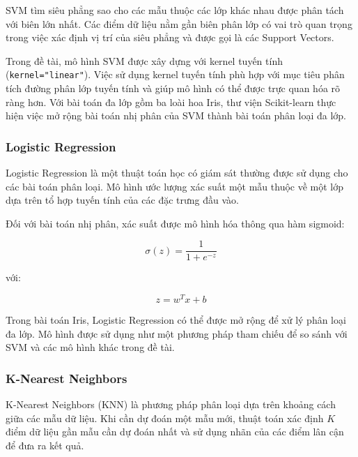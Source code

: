 \documentclass[14pt]{extarticle}
\begin{document}
		 	\noindent SVM tìm siêu phẳng sao cho các mẫu thuộc các lớp khác nhau được phân tách với biên lớn nhất. Các điểm dữ liệu nằm gần biên phân lớp có vai trò quan trọng trong việc xác định vị trí của siêu phẳng và được gọi là các Support Vectors.
		 
		 	\noindent Trong đề tài, mô hình SVM được xây dựng với kernel tuyến tính
		 (\texttt{kernel="linear"}). Việc sử dụng kernel tuyến tính phù hợp với mục
		 tiêu phân tích đường phân lớp tuyến tính và giúp mô hình có thể được
		 trực quan hóa rõ ràng hơn.
		 \newpage
		\noindent  Với bài toán đa lớp gồm ba loài hoa Iris, thư viện Scikit-learn thực hiện việc mở rộng bài toán nhị phân của SVM thành bài toán phân loại đa lớp.\\
		
		 \subsubsection{Logistic Regression}
		 
			\noindent Logistic Regression là một thuật toán học có giám sát thường được sử dụng cho các bài toán phân loại. Mô hình ước lượng xác suất một mẫu thuộc về một lớp dựa trên tổ hợp tuyến tính của các đặc trưng đầu vào.
		 
		 	\noindent Đối với bài toán nhị phân, xác suất được mô hình hóa thông qua hàm sigmoid:
		 
		 \begin{equation*}
		 	\sigma(z) = \frac{1}{1+e^{-z}}
		 \end{equation*}
		 
		 với:
		 
		 \begin{equation*}
		 	z = w^T x + b
		 \end{equation*}
		 
			\noindent  Trong bài toán Iris, Logistic Regression có thể được mở rộng để xử lý phân loại đa lớp. Mô hình được sử dụng như một phương pháp tham chiếu để so sánh với SVM và các mô hình khác trong đề tài.\\
			\subsubsection{K-Nearest Neighbors}
			
				\noindent K-Nearest Neighbors (KNN) là phương pháp phân loại dựa trên khoảng cách giữa các mẫu dữ liệu. Khi cần dự đoán một mẫu mới, thuật toán xác định $K$ điểm dữ liệu gần mẫu cần dự đoán nhất và sử dụng nhãn của các điểm lân cận để đưa ra kết quả.
			
\end{document}
